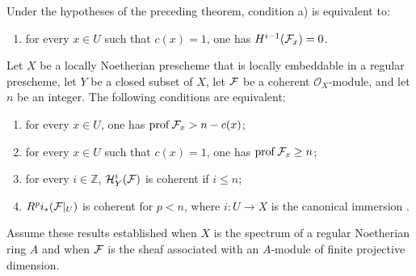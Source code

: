 \setcounter{section}{2}
\setcounter{sourcecorollary}{1}
\begin{sourcecorollary}\label{VIII.2.2}
Under the hypotheses of the preceding theorem, condition \textup{a)} is
equivalent to:
\begin{enumerate}[label=\textup{\alph*)},start=3,leftmargin=2.2em]
\item for every $x\in U$ such that $c(x)=1$, one has
  $H^{i-1}(\cF_x)=0$.
\end{enumerate}
\end{sourcecorollary}


\setcounter{section}{2}
\setcounter{sourcecorollary}{2}
\begin{sourcecorollary}\label{VIII.2.3}
Let $X$ be a locally Noetherian prescheme that is locally embeddable in a
regular prescheme, let $Y$ be a closed subset of $X$, let $\cF$ be a coherent
$\mathcal O_X$-module, and let $n$ be an integer. The following conditions are
equivalent:
\begin{enumerate}[label=\textup{(\roman*)},leftmargin=2.8em]
\item for every $x\in U$, one has
  $\prof \cF_x>n-c(x)$;
\item for every $x\in U$ such that $c(x)=1$, one has
  $\prof \cF_x\geq n$;
\item for every $i\in\mathbb Z$, $\mathcal H^i_Y(\cF)$ is coherent if
  $i\leq n$;
\item $R^p i_*(\cF|_U)$ is coherent for $p<n$, where $i\colon U\to X$ is the canonical immersion%
.
\end{enumerate}
\end{sourcecorollary}


\medskip
Assume these results established when $X$ is the spectrum of a regular
Noetherian ring $A$ and when $\cF$ is the sheaf associated with an $A$-module
of finite projective dimension.

